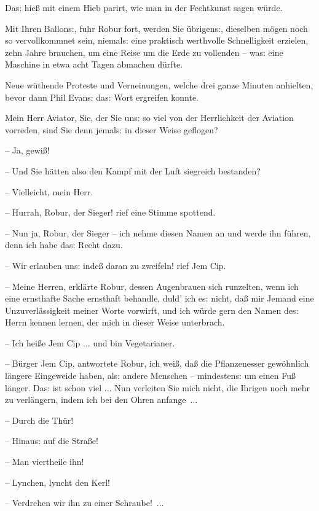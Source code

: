 \documentclass[oneside,12pt]{book}
\newcommand{\s}{s:}
\begin{document}
Da{\s} hie{\ss} {\glqq}mit einem Hieb parirt{\grqq}, wie man in der
Fechtkunst sagen w\"urde.

{\glqq}Mit Ihren Ballon{\s}, fuhr Robur fort, werden Sie
\"ubrigen{\s}, dieselben m\"ogen noch so vervollkommnet sein,
niemal{\s} eine praktisch werthvolle Schnelligkeit erzielen, zehn
Jahre brauchen, um eine Reise um die Erde zu vollenden -- wa{\s} eine
Maschine in etwa acht Tagen abmachen d\"urfte.{\grqq}

Neue w\"uthende Proteste und Verneinungen, welche drei ganze Minuten
anhielten, bevor dann Phil Evan{\s} da{\s} Wort ergreifen konnte.

{\glqq}Mein Herr Aviator, Sie, der Sie un{\s} so viel von der
Herrlichkeit der Aviation vorreden, sind Sie denn jemal{\s} in dieser
Weise geflogen?

-- Ja, gewi{\ss}!

-- Und Sie h\"atten also den Kampf mit der Luft siegreich bestanden?

-- Vielleicht, mein Herr.

-- Hurrah, Robur, der Sieger! rief eine Stimme spottend.

-- Nun ja, Robur, der Sieger -- ich nehme diesen Namen an und werde
ihn f\"uhren, denn ich habe da{\s} Recht dazu.

-- Wir erlauben un{\s} inde{\ss} daran zu zweifeln! rief Jem Cip.

-- Meine Herren, erkl\"arte Robur, dessen Augenbrauen sich runzelten,
wenn ich eine ernsthafte Sache ernsthaft behandle, duld' ich e{\s}
nicht, da{\ss} mir Jemand eine Unzuverl\"assigkeit meiner Worte
vorwirft, und ich w\"urde gern den Namen de{\s} Herrn kennen lernen,
der mich in dieser Weise unterbrach.

-- Ich hei{\ss}e Jem Cip ... und bin Vegetarianer.

-- B\"urger Jem Cip, antwortete Robur, ich wei{\ss}, da{\ss} die
Pflanzenesser gew\"ohnlich l\"angere Eingeweide haben, al{\s} andere
Menschen -- mindesten{\s} um einen Fu{\ss} l\"anger. Da{\s} ist schon
viel ... Nun verleiten Sie mich nicht, die Ihrigen noch mehr zu
verl\"angern, indem ich bei den Ohren anfange~...

-- Durch die Th\"ur!

-- Hinau{\s} auf die Stra{\ss}e!

-- Man viertheile ihn!

-- Lynchen, lyncht den Kerl!

-- Verdrehen wir ihn zu einer Schraube!~...{\grqq}
\end{document}
